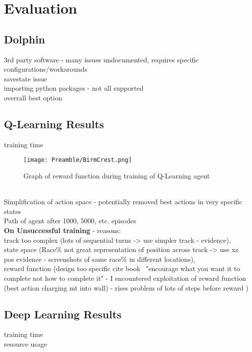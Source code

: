 
\chapter{Evaluation}

\section{Dolphin}
3rd party software - many issues undocumented, requires specific configurations/workarounds
\\ savestate issue
\\importing python packages - not all supported
\\overrall best option

\section{Q-Learning Results}
training time \\
\begin{figure}
    \centering
    \texttt{[image: Preamble/BirmCrest.png]}
    \caption{Graph of reward function during training of Q-Learning agent}
    \label{fig:training-reward-q}
\end{figure}
\\Simplification of action space - potentially removed best actions in very specific states
\\Path of agent after 1000, 5000, etc. episodes
\\ \textbf{On Unsuccessful training} - reasons: \\track too complex (lots of sequential turns -> use simpler track - evidence), \\state space (Race\% not great representation of position across track -> use xz pos evidence - screenshots of same race\% in different locations), \\reward function (design too specific {cite book} ~"encourage what you want it to complete not how to complete it" - I encountered exploitation of reward function (best action charging mt into wall) - rises problem of lots of steps before reward \cite{mnih2013playing})

\section{Deep Learning Results}
training time \\ resource usage

